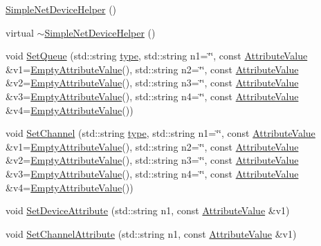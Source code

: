 \begin{DoxyCompactItemize}
\item 
\hyperlink{classns3_1_1SimpleNetDeviceHelper_aaf4a39464e7a4ece2bc336a4cacff963}{Simple\+Net\+Device\+Helper} ()
\item 
virtual \hyperlink{classns3_1_1SimpleNetDeviceHelper_a1128ae4d46359fe4d46fd54c7b48bc55}{$\sim$\+Simple\+Net\+Device\+Helper} ()
\item 
void \hyperlink{classns3_1_1SimpleNetDeviceHelper_ab973e9e806fc38d869ffc2f78a1daa9e}{Set\+Queue} (std\+::string \hyperlink{visualizer-ideas_8txt_add98db9e15e2a58cf2b57623e7aa893a}{type}, std\+::string n1=\char`\"{}\char`\"{}, const \hyperlink{classns3_1_1AttributeValue}{Attribute\+Value} \&v1=\hyperlink{classns3_1_1EmptyAttributeValue}{Empty\+Attribute\+Value}(), std\+::string n2=\char`\"{}\char`\"{}, const \hyperlink{classns3_1_1AttributeValue}{Attribute\+Value} \&v2=\hyperlink{classns3_1_1EmptyAttributeValue}{Empty\+Attribute\+Value}(), std\+::string n3=\char`\"{}\char`\"{}, const \hyperlink{classns3_1_1AttributeValue}{Attribute\+Value} \&v3=\hyperlink{classns3_1_1EmptyAttributeValue}{Empty\+Attribute\+Value}(), std\+::string n4=\char`\"{}\char`\"{}, const \hyperlink{classns3_1_1AttributeValue}{Attribute\+Value} \&v4=\hyperlink{classns3_1_1EmptyAttributeValue}{Empty\+Attribute\+Value}())
\item 
void \hyperlink{classns3_1_1SimpleNetDeviceHelper_a2a9c8af3e0dda34507db9d41c7b2a522}{Set\+Channel} (std\+::string \hyperlink{visualizer-ideas_8txt_add98db9e15e2a58cf2b57623e7aa893a}{type}, std\+::string n1=\char`\"{}\char`\"{}, const \hyperlink{classns3_1_1AttributeValue}{Attribute\+Value} \&v1=\hyperlink{classns3_1_1EmptyAttributeValue}{Empty\+Attribute\+Value}(), std\+::string n2=\char`\"{}\char`\"{}, const \hyperlink{classns3_1_1AttributeValue}{Attribute\+Value} \&v2=\hyperlink{classns3_1_1EmptyAttributeValue}{Empty\+Attribute\+Value}(), std\+::string n3=\char`\"{}\char`\"{}, const \hyperlink{classns3_1_1AttributeValue}{Attribute\+Value} \&v3=\hyperlink{classns3_1_1EmptyAttributeValue}{Empty\+Attribute\+Value}(), std\+::string n4=\char`\"{}\char`\"{}, const \hyperlink{classns3_1_1AttributeValue}{Attribute\+Value} \&v4=\hyperlink{classns3_1_1EmptyAttributeValue}{Empty\+Attribute\+Value}())
\item 
void \hyperlink{classns3_1_1SimpleNetDeviceHelper_a694a89c1d187f3f54b247821d6200ee2}{Set\+Device\+Attribute} (std\+::string n1, const \hyperlink{classns3_1_1AttributeValue}{Attribute\+Value} \&v1)
\item 
void \hyperlink{classns3_1_1SimpleNetDeviceHelper_a33f9c79d2dc1dab844030c7e85b7babd}{Set\+Channel\+Attribute} (std\+::string n1, const \hyperlink{classns3_1_1AttributeValue}{Attribute\+Value} \&v1)

\end{DoxyCompactItemize}
